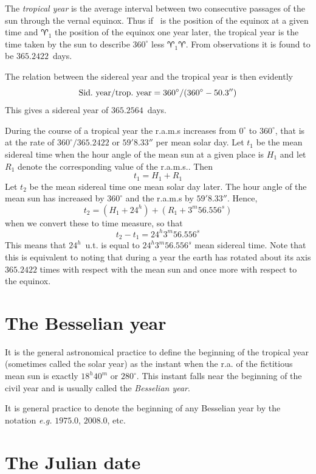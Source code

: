 The {\it tropical year} is the average interval between two consecutive 
passages of the sun through the vernal equinox. Thus if \aries\ is the 
position of the equinox
at a given time and $\aries_1$ the position of the equinox one year later, the 
tropical year is the time taken by the sun to describe $360^\circ$ less 
$\aries_1\aries$. From observations it is found to be $365.2422$~days. 

The relation between the sidereal year and the tropical year is then evidently
\[ 
{{\rm Sid.~year}/{\rm trop.~year}}={360^\circ/{(360^\circ-50.3'')}}
\]
This gives a sidereal year of $365.2564$~days.

During the course of a tropical year the {\sc r.a.m.s} increases from $0^\circ$ to
$360^\circ$, that is at the rate of $360^\circ/365.2422$ or $59'8.33''$ per mean 
solar day. Let $t_1$ be the mean sidereal time when the hour angle of the mean sun
at a given place is $H_1$ and let $R_1$ denote the corresponding value of 
the {\sc r.a.m.s.}. Then
\[
t_1=H_1+R_1
\]
Let $t_2$ be the mean sidereal time one mean solar day later. The hour angle of 
the mean sun has increased by $360^\circ$ and the {\sc r.a.m.s} by $59'8.33''$.
Hence,
\[
t_2=(H_1+24^h)+(R_1+3^m56.556^s)
\]
when we convert these to time measure, so that 
\[
t_2-t_1=24^h3^m56.556^s
\]
This means that $24^h$~{\sc u.t.} is equal to $24^h3^m56.556^s$ mean sidereal time.
Note that this is equivalent to noting that during a year the earth has rotated about
its axis $365.2422$ times with respect with the mean sun and once more with respect
to the equinox.

\section{The Besselian year}

It is the general astronomical practice to define the beginning of the tropical year
(sometimes called the solar year) as the instant when the {\sc r.a.} of the fictitious
mean sun is exactly $18^h40^m$ or $280^\circ$. This instant falls near the beginning of
the civil year and is usually called the {\it Besselian year}. 

It is general practice to denote the beginning of any Besselian year by the notation
{\it e.g.} $1975.0$, $2008.0$, etc.

\section{The Julian date}

